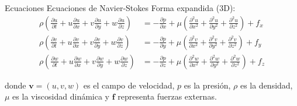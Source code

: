 \begin{frame}{Ecuaciones}
    Ecuaciones de Navier-Stokes Forma expandida (3D):
    \footnotesize
        \begin{align*}
            \rho\left(\frac{\partial u}{\partial t} + u\frac{\partial u}{\partial x} + v\frac{\partial u}{\partial y} + w\frac{\partial u}{\partial z}\right) &= -\frac{\partial p}{\partial x} + \mu\left(\frac{\partial^2 u}{\partial x^2} + \frac{\partial^2 u}{\partial y^2} + \frac{\partial^2 u}{\partial z^2}\right) + f_x \\[0.3cm]
            \rho\left(\frac{\partial v}{\partial t} + u\frac{\partial v}{\partial x} + v\frac{\partial v}{\partial y} + w\frac{\partial v}{\partial z}\right) &= -\frac{\partial p}{\partial y} + \mu\left(\frac{\partial^2 v}{\partial x^2} + \frac{\partial^2 v}{\partial y^2} + \frac{\partial^2 v}{\partial z^2}\right) + f_y \\[0.3cm]
            \rho\left(\frac{\partial w}{\partial t} + u\frac{\partial w}{\partial x} + v\frac{\partial w}{\partial y} + w\frac{\partial w}{\partial z}\right) &= -\frac{\partial p}{\partial z} + \mu\left(\frac{\partial^2 w}{\partial x^2} + \frac{\partial^2 w}{\partial y^2} + \frac{\partial^2 w}{\partial z^2}\right) + f_z
        \end{align*}
        
    donde $\mathbf{v} = (u,v,w)$ es el campo de velocidad, $p$ es la presión, $\rho$ es la densidad, $\mu$ es la viscosidad dinámica y $\mathbf{f}$ representa fuerzas externas.
\end{frame}